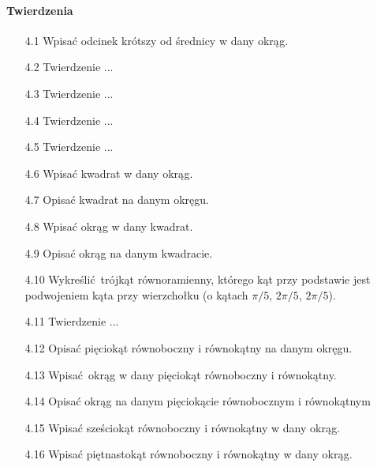\paragraph{Twierdzenia}
\begin{enumerate}
	\item [4.1] Wpisać odcinek krótszy od średnicy w dany okrąg.
	\item [4.2] Twierdzenie ...
	\item [4.3] Twierdzenie ...
	\item [4.4] Twierdzenie ...
	\item [4.5] Twierdzenie ...
	\item [4.6] Wpisać kwadrat w dany okrąg.
	\item [4.7] Opisać kwadrat na danym okręgu.
	\item [4.8] Wpisać okrąg w dany kwadrat.
	\item [4.9] Opisać okrąg na danym kwadracie.
	\item [4.10] Wykreślić trójkąt równoramienny, którego kąt przy podstawie jest podwojeniem kąta przy wierzchołku (o kątach $\pi/5$, $2\pi/5$, $2\pi/5$).
	\item [4.11] Twierdzenie ...
	\item [4.12] Opisać pięciokąt równoboczny i równokątny na danym okręgu.
	\item [4.13] Wpisać okrąg w dany pięciokąt równoboczny i równokątny.
	\item [4.14] Opisać okrąg na danym pięciokącie równobocznym i równokątnym
	\item [4.15] Wpisać sześciokąt równoboczny i równokątny w dany okrąg.
	\item [4.16] Wpisać piętnastokąt równoboczny i równokątny w dany okrąg.
\end{enumerate}

%